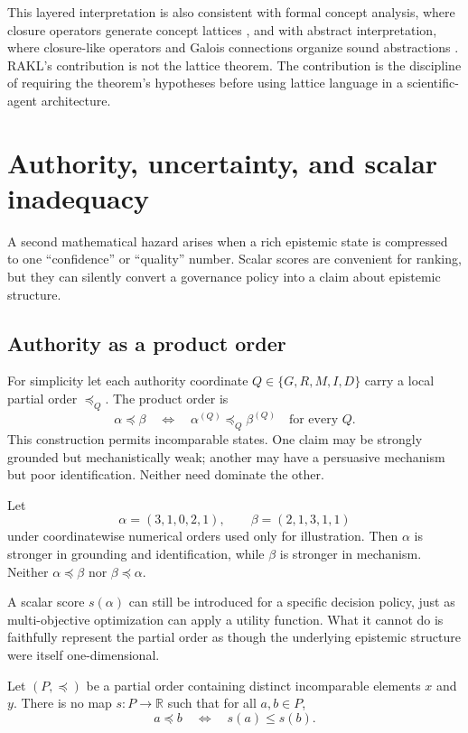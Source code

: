This layered interpretation is also consistent with formal concept analysis, where closure operators generate concept lattices \cite{ganter1999}, and with abstract interpretation, where closure-like operators and Galois connections organize sound abstractions \cite{cousot1977}. RAKL's contribution is not the lattice theorem. The contribution is the discipline of requiring the theorem's hypotheses before using lattice language in a scientific-agent architecture.

\section{Authority, uncertainty, and scalar inadequacy}

A second mathematical hazard arises when a rich epistemic state is compressed to one ``confidence'' or ``quality'' number. Scalar scores are convenient for ranking, but they can silently convert a governance policy into a claim about epistemic structure.

\subsection{Authority as a product order}

For simplicity let each authority coordinate \(Q\in\{G,R,M,I,D\}\) carry a local partial order \(\preceq_Q\). The product order is
\[
\alpha\preceq\beta
\quad\Longleftrightarrow\quad
\alpha^{(Q)}\preceq_Q\beta^{(Q)}\quad\text{for every }Q.
\]
This construction permits incomparable states. One claim may be strongly grounded but mechanistically weak; another may have a persuasive mechanism but poor identification. Neither need dominate the other.

\begin{example}
Let
\[
\alpha=(3,1,0,2,1),\qquad \beta=(2,1,3,1,1)
\]
under coordinatewise numerical orders used only for illustration. Then \(\alpha\) is stronger in grounding and identification, while \(\beta\) is stronger in mechanism. Neither \(\alpha\preceq\beta\) nor \(\beta\preceq\alpha\).
\end{example}

A scalar score \(s(\alpha)\) can still be introduced for a specific decision policy, just as multi-objective optimization can apply a utility function. What it cannot do is faithfully represent the partial order as though the underlying epistemic structure were itself one-dimensional.

\begin{theorem}
Let \((P,\preceq)\) be a partial order containing distinct incomparable elements \(x\) and \(y\). There is no map \(s:P\to\mathbb R\) such that for all \(a,b\in P\),
\[
a\preceq b\quad\Longleftrightarrow\quad s(a)\le s(b).
\]
\end{theorem}

